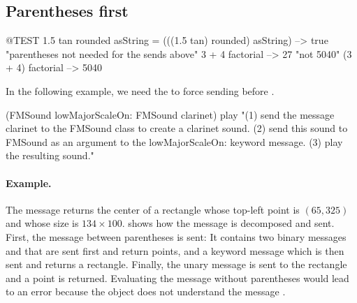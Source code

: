 \documentclass[a4paper,10pt,twoside]{book}
\begin{document}
\subsection{Parentheses first}


\begin{code}{@TEST}
1.5 tan rounded asString = (((1.5 tan) rounded) asString) --> true                                 "parentheses not needed for the sends above"
3 + 4 factorial   --> 27    "not 5040"
(3 + 4) factorial --> 5040
\end{code}

In the following example, we need the  to force sending  before .
\begin{code}{}
(FMSound lowMajorScaleOn: FMSound clarinet) play
"(1) send the message clarinet to the FMSound class to create a clarinet sound.
 (2) send this sound to FMSound as an argument to the lowMajorScaleOn: keyword message.
 (3) play the resulting sound."
\end{code}



\paragraph{Example.}
The message  returns the center of a rectangle whose top-left point is $(65, 325)$ and whose size is $134{\times}100$.
 shows how the message is decomposed and sent.
First, the message between parentheses is sent:
It contains two binary messages  and  that are sent first and return points, and a keyword message  which is then sent and returns a rectangle.
Finally, the unary message  is sent to the rectangle and a point is returned.
Evaluating the message without parentheses would lead to an error because the object  does not understand the message .
\end{document}
